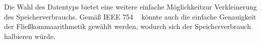 \documentclass[course=erap] {aspdoc}
\begin{document}
    Die Wahl des Datentyps bietet eine weitere einfache Möglichkeitzur Verkleinerung des Speicherverbrauchs. Gemäß IEEE 754 ~\cite{StandardforBinaryFloating} könnte auch die einfache Genauigkeit der Fließkommaarithmetik gewählt werden, wodurch sich der Speicherverbrauch halbieren würde.

    
    
\end{document}
